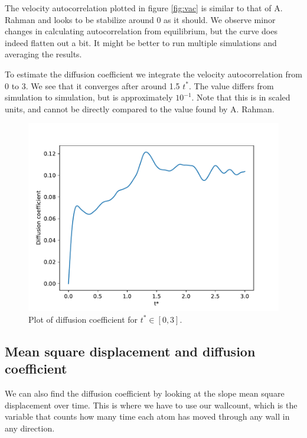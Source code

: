 \documentclass[a4paper,10pt,english]{article}
\begin{document}
The velocity autocorrelation plotted in figure \ref{fig:vac} is similar to that of A. Rahman and looks to be stabilize around 0 as it should. We observe minor changes in calculating autocorrelation from equilibrium, but the curve does indeed flatten out a bit. It might be better to run multiple simulations and averaging the results. 

\newpage

To estimate the diffusion coefficient we integrate the velocity autocorrelation from 0 to 3. We see that it converges after around 1.5 $t^*$. The value differs from simulation to simulation, but is approximately $10^{-1}$. Note that this is in scaled units, and cannot be directly compared to the value found by A. Rahman.

\begin{figure}[h!]
    \centering
    \includegraphics[scale=0.65]{../figures/4_b_v.pdf}
    \caption{Plot of diffusion coefficient for $t^* \in [0, 3]$.}
    \label{fig:diff}
\end{figure}

\subsection{Mean square displacement and diffusion coefficient} \label{4c}

We can also find the diffusion coefficient by looking at the slope mean square displacement over time. This is where we have to use our wallcount, which is the variable that counts how many time each atom has moved through any wall in any direction.
\end{document}
